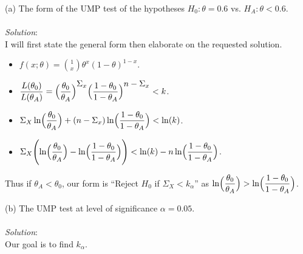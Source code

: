 \documentclass[12pt]{article}
\newcommand{\XB}{\color{black}}
\newcommand{\XBB}{\color{blue}}
\newcommand{\ds}{\displaystyle}
\begin{document}
\XBB\hrulefill\XB
\vspace{5mm}

(a) The form of the UMP test of the hypotheses $ H_{0} : \theta = 0.6 $ vs. $ H_{A} : \theta < 0.6 $. \\
\vspace{2.5mm} \\
\textit{Solution}:
\vspace{2.5mm} \\

\noindent
I will first state the general form then elaborate on the requested solution. \\

\begin{itemize}
    \item $ \ds f(x; \theta) = \binom{1}{x} \theta^{x} (1 - \theta)^{1 - x} $.
    \item $ \ds \frac{L(\theta_{0})}{L(\theta_{A})} = \Bigl( \frac{\theta_{0}}{\theta_{A}} \Bigr)^{\ds \Sigma_{x}} \Bigl( \frac{1 - \theta_{0}}{1 -\theta_{A}} \Bigr)^{\ds n - \Sigma_{x}} < k $.
    \item $ \ds \Sigma_{X} \ln\Bigl( \frac{\theta_{0}}{\theta_{A}} \Bigr) + (n - \Sigma_{x})\ln\Bigl( \frac{1 - \theta_{0}}{1 -\theta_{A}} \Bigr)  < \ln(k) $.
    \item $ \ds \Sigma_{X} \Biggl( \ln\Bigl( \frac{\theta_{0}}{\theta_{A}} \Bigr) - \ln\Bigl( \frac{1 - \theta_{0}}{1 -\theta_{A}} \Bigr) \Biggr) < \ln(k) - n\ln\Bigl( \frac{1 - \theta_{0}}{1 -\theta_{A}} \Bigr) $.
\end{itemize}

\noindent
Thus if $ \theta_{A} < \theta_{0} $, our form is ``Reject $ H_{0} $ if $ \Sigma_{X} < k_{\alpha} $'' as $ \ds \ln\Bigl( \frac{\theta_{0}}{\theta_{A}} \Bigr) > \ln\Bigl( \frac{1 - \theta_{0}}{1 -\theta_{A}} \Bigr) $. \\

\vspace{2.5mm}

(b) The UMP test at level of significance $ \alpha = 0.05 $. \\
\vspace{2.5mm} \\
\textit{Solution}:
\vspace{2.5mm} \\

\noindent
Our goal is to find $ k_{\alpha} $. \\
\end{document}
